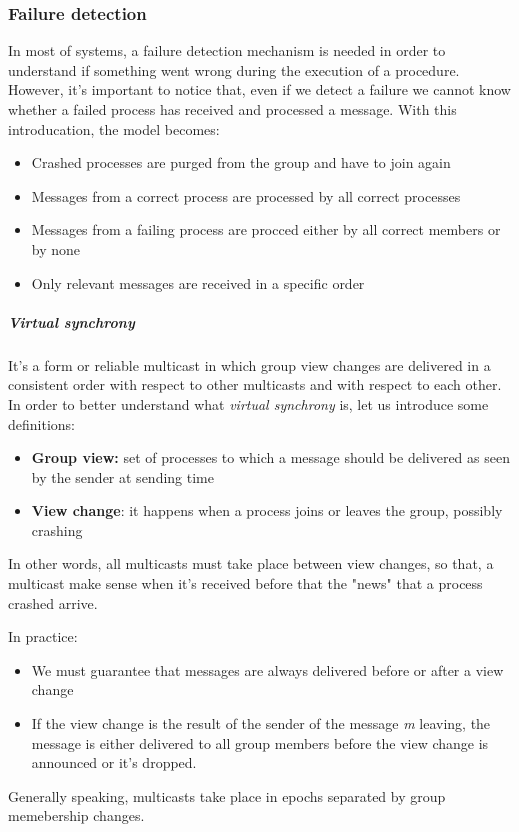 \subsubsection{Failure detection}\label{detect-a-failure}
In most of systems, a failure detection mechanism is needed in order to understand if something went wrong during the execution of a procedure. However, it's important to notice that, even if we detect a failure we cannot know whether a failed process has received and processed a message.
With this introducation, the model becomes:
\begin{itemize}
\itemsep1pt\parskip0pt
\item
  Crashed processes are purged from the group and have to join again
\item
  Messages from a correct process are processed by all correct processes
\item
  Messages from a failing process are procced either by all correct
  members or by none
\item
  Only relevant messages are received in a specific order
\end{itemize}

\subparagraph{Virtual synchrony}
It's a form or reliable multicast in which group view changes are delivered in a consistent order with respect to other multicasts and with respect to each other.\\

In order to better understand what \textit{virtual synchrony} is, let us introduce some definitions:
\begin{itemize}
    \item \textbf{Group view:} set of processes to which a message should be delivered as seen by the sender at sending time
    \item \textbf{View change}: it happens when a process joins or leaves the group, possibly crashing
\end{itemize}

In other words, all multicasts must take place between view changes, so that, a
multicast make sense when it's received before that the "news" that a process crashed arrive.

In practice:
\begin{itemize}
\itemsep1pt\parskip0pt
\item
  We must guarantee that messages are always delivered before or after a
  view change
\item
  If the view change is the result of the sender of the message \emph{m}
  leaving, the message is either delivered to all group members before
  the view change is announced or it's dropped.
\end{itemize}
Generally speaking, multicasts take place in epochs separated by group memebership changes.

